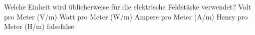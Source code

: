     {Welche Einheit wird üblicherweise für die elektrische Feldstärke verwendet?}
    {Volt pro Meter (V/m)}
    {Watt pro Meter (W/m)}
    {Ampere pro Meter (A/m)}
    {Henry pro Meter (H/m)}
    {false}{false}